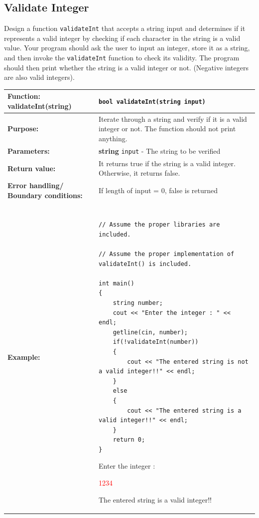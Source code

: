 \subsection{Validate Integer}
Design a function \texttt{validateInt} that accepts a string input and determines if it represents a valid integer by checking if each character in the string is a valid value. Your program should ask the user to input an integer, store it as a string, and then invoke the \texttt{validateInt} function to check its validity. The program should then print whether the string is a valid integer or not. (Negative integers are also valid integers).


\begin{table}[H]
    \centering
    \begin{tabular}{|p{1.7in}|p{4.3in}|} \hline
        \textbf{Function:} \newline 
        validateInt(string) & \texttt{bool validateInt(string input)}\\ \hline
        \textbf{Purpose:}  &  Iterate through a string and verify if it is a valid integer or not. The function should not print anything. \\ \hline
        \textbf{Parameters:} &  \hangindent=1cm \textbf{string} \texttt{input} - The string to be verified  \\ \hline
        \textbf{Return value:} &  It returns true if the string is a valid integer. Otherwise, it returns false. \\ \hline
        \textbf{Error handling/} \newline
        \textbf{Boundary conditions:} & If length of input = 0, false is returned  \\ \hline
        \textbf{Example:} & 
        \begin{example}
            \begin{verbatim}
            
// Assume the proper libraries are included.

// Assume the proper implementation of validateInt() is included.

int main()
{
    string number;
    cout << "Enter the integer : " << endl;
    getline(cin, number);
    if(!validateInt(number))
    {
        cout << "The entered string is not a valid integer!!" << endl;
    }
    else
    {
        cout << "The entered string is a valid integer!!" << endl;
    }
    return 0;
}
            \end{verbatim}
        \end{example}

        \begin{sample}
Enter the integer :

\textcolor{red}{1234}

The entered string is a valid integer!!
        \end{sample}
             \\ \hline
    \end{tabular}
\end{table}

